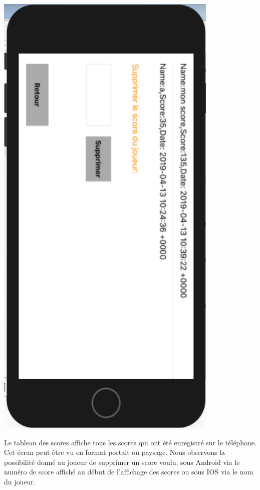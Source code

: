 \documentclass{article}
\begin{document}
   \begin{minipage}[c]{.46\linewidth}
    \begin{center}
            \includegraphics[scale=0.38]{tableauscoreIOS.png}
        \end{center}
 \end{minipage}

Le tableau des scores affiche tous les scores qui ont été enregistré sur le téléphone. Cet écran peut être vu en format portait ou paysage. Nous observons la possibilité donné au joueur de supprimer un score voulu, sous Android via le numéro de score affiché au début de l'affichage des scores ou sous IOS via le nom du joueur. 
\end{document}
